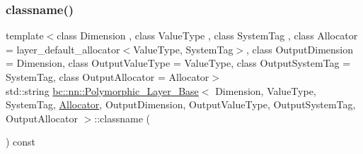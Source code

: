 \mbox{\label{structbc_1_1nn_1_1Polymorphic__Layer__Base_a3a63312d3100e6a6c31ba6bd16578aa7}} 
\subsubsection{\texorpdfstring{classname()}{classname()}\hspace{0.1cm}{\footnotesize\ttfamily [2/2]}}
{\footnotesize\ttfamily template$<$class Dimension , class Value\+Type , class System\+Tag , class Allocator  = layer\+\_\+default\+\_\+allocator$<$\+Value\+Type, System\+Tag$>$, class Output\+Dimension  = Dimension, class Output\+Value\+Type  = Value\+Type, class Output\+System\+Tag  = System\+Tag, class Output\+Allocator  = Allocator$>$ \\
std\+::string \hyperlink{structbc_1_1nn_1_1Polymorphic__Layer__Base}{bc\+::nn\+::\+Polymorphic\+\_\+\+Layer\+\_\+\+Base}$<$ Dimension, Value\+Type, System\+Tag, \hyperlink{classbc_1_1allocators_1_1Allocator}{Allocator}, Output\+Dimension, Output\+Value\+Type, Output\+System\+Tag, Output\+Allocator $>$\+::classname (\begin{DoxyParamCaption}{ }\end{DoxyParamCaption}) const\hspace{0.3cm}{\ttfamily [inline]}}

\mbox{\label{structbc_1_1nn_1_1Polymorphic__Layer__Base_a1233eecaa679d32a0203c13870cbe564}} 

